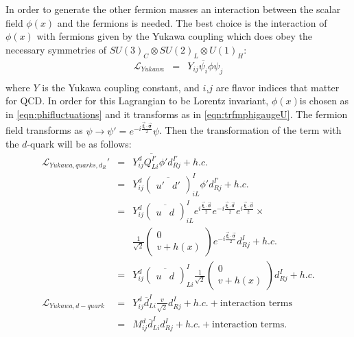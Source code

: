In order to generate the other fermion masses an interaction between the scalar field $\phi(x)$ and the fermions is needed. The best choice is the interaction of $\phi(x)$ with fermions given by the Yukawa coupling \cite{noteskooijman11} which does obey the necessary symmetries of $SU(3)_C \otimes SU(2)_L \otimes U(1)_H$:
\begin{eqnarray}
\mathcal L_{Yukawa} &=& Y_{ij}\overline{\psi_{i}}\phi\psi_{j}\\
\label{eqn:SMLYukawa}
\end{eqnarray}
where $Y$ is the Yukawa coupling constant, and $i$,$j$ are flavor indices that matter for QCD.
In order for this Lagrangian to be Lorentz invariant, $\phi(x)$is chosen as in \autoref{eqn:phifluctuations} and it transforms as in \autoref{eqn:trfmphigaugeU}. The fermion field transforms as $\psi \rightarrow \psi' = e^{-i\frac{\boldsymbol{\vec{\xi}\cdot\vec{\sigma}}}{2}} \psi$. Then the transformation of the term with the $d$-quark will be as follows:
\begin{eqnarray}
\mathcal L_{Yukawa,quarks,d_R}' &=&  Y^d_{ij}\overline{Q^{I'}_{Li}}\phi' d^{I'}_{Rj} + h.c. \nonumber \\
&=&  Y^d_{ij} \left(  \overline{\begin{array}{cc} u' & d' \end{array}}  \right)^I_{iL} \phi' d^{I'}_{Rj} + h.c.\nonumber\\
&=&  Y^d_{ij} \left( \overline{ \begin{array}{cc} u & d \end{array} } \right)^I_{iL} e^{i\frac{\boldsymbol{\vec{\xi}\cdot\vec{\sigma}}}{2}} e^{-i\frac{\boldsymbol{\vec{\xi}\cdot\vec{\sigma}}}{2}}   e^{i\frac{\boldsymbol{\vec{\xi}\cdot\vec{\sigma}}}{2}} \times \nonumber \\
&& \frac{1}{\sqrt{2}} \left( \begin{array}{c} 0 \\ v + h(x)\end{array} \right)  e^{-i\frac{\boldsymbol{\vec{\xi}\cdot\vec{\sigma}}}{2}} d^I_{Rj} + h.c.\nonumber \\
&=& Y^d_{ij}  \left( \overline{ \begin{array}{cc} u & d \end{array} } \right)^I_{Li}  \frac{1}{\sqrt{2}} \left( \begin{array}{c} 0 \\ v + h(x)\end{array} \right)  d^I_{Rj} + h.c.\nonumber \\
\mathcal L_{Yukawa,d-quark} &=&  Y^d_{ij}   \overline{d}^I_{Li} \frac{v}{\sqrt{2}} d^I_{Rj}  + h.c. + \mbox{interaction terms} \nonumber \\
&=& M^d_{ij}\overline{d}^I_{Li}d^I_{Rj} + h.c. + \mbox{interaction terms}.
\label{eqn:SMLYukawaDquark}
\end{eqnarray}

